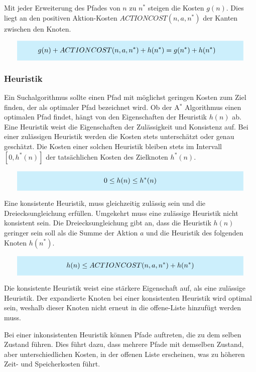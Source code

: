 Mit jeder Erweiterung des Pfades von $n$ zu $n^{\ast}$ steigen die Kosten $g(n)$. Dies liegt an den positiven Aktion-Kosten $ACTIONCOST(n,a,n^*)$ der Kanten zwischen den Knoten.

\[
\highlightbox{0.9\textwidth}{$
    \begin{aligned}
			g(n) + ACTIONCOST(n,a,n^*) + h(n^*) &= g(n^*) + h(n^*)
    \end{aligned}
$}
\]

\subsubsection{Heuristik}

Ein Suchalgorithmus sollte einen Pfad mit möglichst geringen Kosten zum Ziel finden, der als optimaler Pfad bezeichnet wird. Ob der A$^*$ Algorithmus einen optimalen Pfad findet, hängt von den Eigenschaften der Heuristik $h(n)$ ab. Eine Heuristik weist die Eigenschaften der Zulässigkeit und Konsistenz auf. Bei einer zulässigen Heuristik werden die Kosten stets unterschätzt oder genau geschätzt. Die Kosten einer solchen Heuristik bleiben stets im Intervall $[0, h^{\ast}(n)]$ der tatsächlichen Kosten des Zielknoten $h^{\ast}(n)$.

\[
\highlightbox{0.9\textwidth}{$
    \begin{aligned}
			0 \leq h(n) \leq h^*(n)
    \end{aligned}
$}
\]

Eine konsistente Heuristik, muss gleichzeitig zulässig sein und die Dreiecksungleichung erfüllen. Umgekehrt muss eine zulässige Heuristik nicht konsistent sein. Die Dreiecksungleichung gibt an, dass die Heuristik $h(n)$ geringer sein soll als die Summe der Aktion $a$ und die Heuristik des folgenden Knoten $h(n^*)$.

\[
\highlightbox{0.9\textwidth}{$
    \begin{aligned}
			h(n) \leq ACTIONCOST(n,a,n^*) + h(n^*)
    \end{aligned}
$}
\]

Die konsistente Heuristik weist eine stärkere Eigenschaft auf, als eine zulässige Heuristik. Der expandierte Knoten bei einer konsistenten Heuristik wird optimal sein, weshalb dieser Knoten nicht erneut in die offene-Liste hinzufügt werden muss.

Bei einer inkonsistenten Heuristik können Pfade auftreten, die zu dem selben Zustand führen. Dies führt dazu, dass mehrere Pfade mit demselben Zustand, aber unterschiedlichen Kosten, in der offenen Liste erscheinen, was zu höheren Zeit- und Speicherkosten führt.


